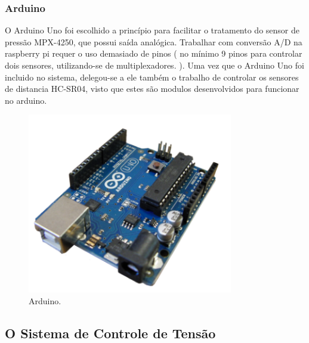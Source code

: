 \subsubsection{Arduino}
O Arduino Uno foi escolhido a princípio para facilitar o tratamento do sensor de pressão MPX-4250, que possui saída analógica. Trabalhar com   conversão A/D na raspberry pi requer o uso demasiado de pinos ( no mínimo 9 pinos para controlar dois sensores, utilizando-se de multiplexadores. ).  Uma vez que o Arduino Uno foi incluido no sistema, delegou-se  a ele também o trabalho de controlar os sensores de distancia HC-SR04, visto  que  estes são modulos desenvolvidos para funcionar no arduino.
\par
\begin{figure}[h]
  \centering
  \includegraphics[width=0.8\textwidth]{figures/arduino.png}
  \caption{Arduino.}
  \label{fig:arduino}
\end{figure}
\FloatBarrier
\par

\subsection{O Sistema de Controle de Tensão}
